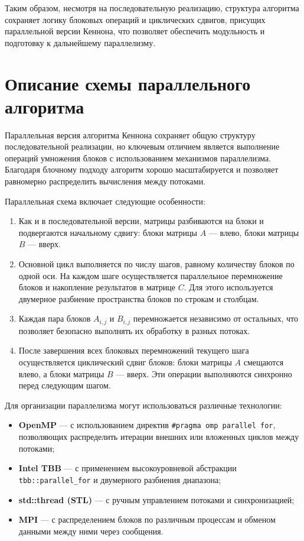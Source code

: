 \documentclass[12pt]{article}
\begin{document}
Таким образом, несмотря на последовательную реализацию, структура алгоритма сохраняет логику блоковых операций и циклических сдвигов, присущих параллельной версии Кеннона, что позволяет обеспечить модульность и подготовку к дальнейшему параллелизму.

\newpage

\section*{Описание схемы параллельного алгоритма}

Параллельная версия алгоритма Кеннона сохраняет общую структуру последовательной реализации, но ключевым отличием является выполнение операций умножения блоков с использованием механизмов параллелизма. Благодаря блочному подходу алгоритм хорошо масштабируется и позволяет равномерно распределить вычисления между потоками.

Параллельная схема включает следующие особенности:

\begin{enumerate}
    \item Как и в последовательной версии, матрицы разбиваются на блоки и подвергаются начальному сдвигу: блоки матрицы \( A \) — влево, блоки матрицы \( B \) — вверх.
    
    \item Основной цикл выполняется по числу шагов, равному количеству блоков по одной оси. На каждом шаге осуществляется параллельное перемножение блоков и накопление результатов в матрице \( C \). Для этого используется двумерное разбиение пространства блоков по строкам и столбцам.
    
    \item Каждая пара блоков \( A_{i,j} \) и \( B_{i,j} \) перемножается независимо от остальных, что позволяет безопасно выполнять их обработку в разных потоках.
    
    \item После завершения всех блоковых перемножений текущего шага осуществляется циклический сдвиг блоков: блоки матрицы \( A \) смещаются влево, а блоки матрицы \( B \) — вверх. Эти операции выполняются синхронно перед следующим шагом.
\end{enumerate}

Для организации параллелизма могут использоваться различные технологии:
\begin{itemize}
    \item \textbf{OpenMP} — с использованием директив \texttt{\#pragma omp parallel for}, позволяющих распределить итерации внешних или вложенных циклов между потоками;
    \item \textbf{Intel TBB} — с применением высокоуровневой абстракции \texttt{tbb::parallel\_for} и двумерного разбиения диапазона;
    \item \textbf{std::thread (STL)} — с ручным управлением потоками и синхронизацией;
    \item \textbf{MPI} — с распределением блоков по различным процессам и обменом данными между ними через сообщения.
\end{itemize}
\end{document}
